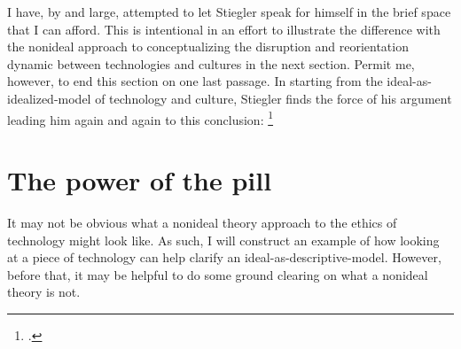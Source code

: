 \documentclass[letterpaper,notitlepage,12pt]{article}
\begin{document}
I have, by and large, attempted to let Stiegler speak for himself in the brief
space that I can afford.
This is intentional in an effort to illustrate the difference with the nonideal
approach to conceptualizing the disruption and reorientation dynamic between
technologies and cultures in the next section.
Permit me, however, to end this section on one last passage.
In starting from the ideal-as-idealized-model of technology and culture,
Stiegler finds the force of his argument leading him again and again to this
conclusion: \footcite[ch. 5.24]{stiegler_age_2019}

\section{The power of the pill}

It may not be obvious what a nonideal theory approach to the ethics of
technology might look like.
As such, I will construct an example of how looking at a piece of technology can
help clarify an ideal-as-descriptive-model.
However, before that, it may be helpful to do some ground clearing on what a
nonideal theory is not.
\end{document}
